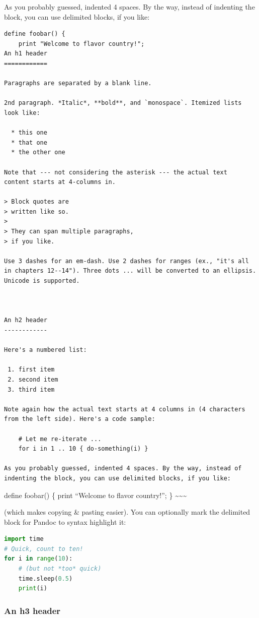 \documentclass[
  12pt,
  a4paper,
  oneside,tablecaptionabove
]{scrbook}
\begin{document}
As you probably guessed, indented 4 spaces. By the way, instead of
indenting the block, you can use delimited blocks, if you like:

\begin{lstlisting}
define foobar() {
    print "Welcome to flavor country!";
An h1 header
============

Paragraphs are separated by a blank line.

2nd paragraph. *Italic*, **bold**, and `monospace`. Itemized lists
look like:

  * this one
  * that one
  * the other one

Note that --- not considering the asterisk --- the actual text
content starts at 4-columns in.

> Block quotes are
> written like so.
>
> They can span multiple paragraphs,
> if you like.

Use 3 dashes for an em-dash. Use 2 dashes for ranges (ex., "it's all
in chapters 12--14"). Three dots ... will be converted to an ellipsis.
Unicode is supported.



An h2 header
------------

Here's a numbered list:

 1. first item
 2. second item
 3. third item

Note again how the actual text starts at 4 columns in (4 characters
from the left side). Here's a code sample:

    # Let me re-iterate ...
    for i in 1 .. 10 { do-something(i) }

As you probably guessed, indented 4 spaces. By the way, instead of
indenting the block, you can use delimited blocks, if you like:
\end{lstlisting}

define foobar() \{ print ``Welcome to flavor country!''; \}
\textasciitilde\textasciitilde\textasciitilde{}

(which makes copying \& pasting easier). You can optionally mark the
delimited block for Pandoc to syntax highlight it:

\begin{lstlisting}[language=Python]
import time
# Quick, count to ten!
for i in range(10):
    # (but not *too* quick)
    time.sleep(0.5)
    print(i)
\end{lstlisting}

\hypertarget{an-h3-header}{%
\subsubsection{An h3 header}\label{an-h3-header}}
\end{document}
